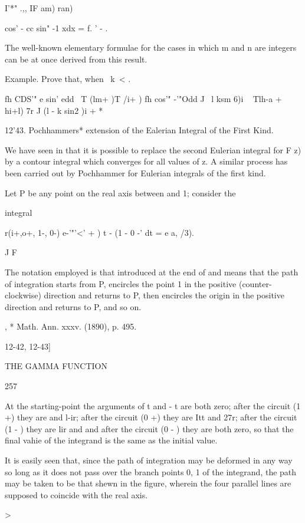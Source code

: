 I'*" .,, IF am) ran)

cos' - cc sin" -1 xdx = f. ' - .

The well-known elementary formulae for the cases in which m and n are
integers can be at once derived from this result.

Example. Prove that, when \ k\ < .\,

fh CDS'" e sin' edd \ T (lm+ )T /i+ ) fh cos'" -'"Odd J \ l ksm 6)i ~
Tlh-a + hi+l) 7r J (l - k sin2 )i + *


12'43. Pochhammers* extension of the Ealerian Integral of the First
Kind.

We have seen in that it is possible to replace the second
Eulerian integral for F z) by a contour integral which converges for
all values of z. A similar process has been carried out by Pochhammer
for Eulerian integrals of the first kind.

Let P be any point on the real axis between and 1; consider the

integral

r(i+,o+, 1-, 0-) e-'"'<' + ) t - (1 - 0 -' dt = e a, /3).

J F

The notation employed is that introduced at the end of and
means that the path of integration starts from P, encircles the point
1 in the positive (counter-clockwise) direction and returns to P, then
encircles the origin in the positive direction and returns to P, and
so on.

, * Math. Ann. xxxv. (1890), p. 495.

12-42, 12-43]

THE GAMMA FUNCTION

257

At the starting-point the arguments of t and - t are both zero; after
the circuit (1 +) they are and l-ir; after the circuit (0 +) they are
Itt and 27r; after the circuit (1 - ) they are lir and and after the
circuit (0 - ) they are both zero, so that the final vahie of the
integrand is the same as the initial value.

It is easily seen that, since the path of integration may be deformed
in any way so long as it does not pass over the branch points 0, 1 of
the integrand, the path may be taken to be that shewn in the figure,
wherein the four parallel lines are supposed to coincide with the real
axis.

>

